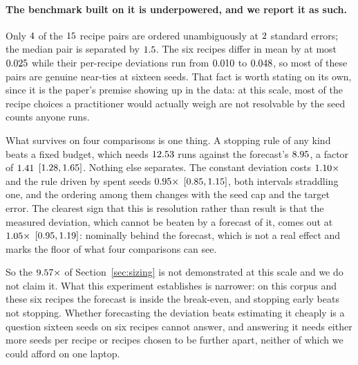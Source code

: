 \paragraph{The benchmark built on it is underpowered, and we report it as such.} Only
$4$ of the $15$ recipe pairs are ordered unambiguously at
$2$ standard errors; the median pair is separated by $1.5$. The six recipes differ
in mean by at most $0.025$ while their per-recipe deviations run from $0.010$ to
$0.048$, so most
of these pairs are genuine near-ties at sixteen seeds. That fact is worth stating on its own, since
it is the paper's premise showing up in the data: at this scale, most of the recipe choices a
practitioner would actually weigh are not resolvable by the seed counts anyone runs.

What survives on four comparisons is one thing. A stopping rule of any kind beats a fixed budget,
which needs $12.53$ runs against the forecast's $8.95$, a factor of
$1.41$ $[1.28, 1.65]$. Nothing else separates. The
constant deviation costs $1.10\times$ and the rule driven by spent seeds
$0.95\times$ $[0.85, 1.15]$, both
intervals straddling one, and the ordering among them changes with the seed cap and the target
error. The clearest sign that this is resolution rather than result is that the measured deviation,
which cannot be beaten by a forecast of it, comes out at $1.05\times$
$[0.95, 1.19]$: nominally behind the forecast, which is not a
real effect and marks the floor of what four comparisons can see.

So the $9.57\times$ of Section~\ref{sec:sizing} is not demonstrated at this scale and
we do not claim it. What this experiment establishes is narrower: on this corpus and these six
recipes the forecast is inside the break-even, and stopping early beats not stopping. Whether
forecasting the deviation beats estimating it cheaply is a question sixteen seeds on six recipes
cannot answer, and answering it needs either more seeds per recipe or recipes chosen to be further
apart, neither of which we could afford on one laptop.
